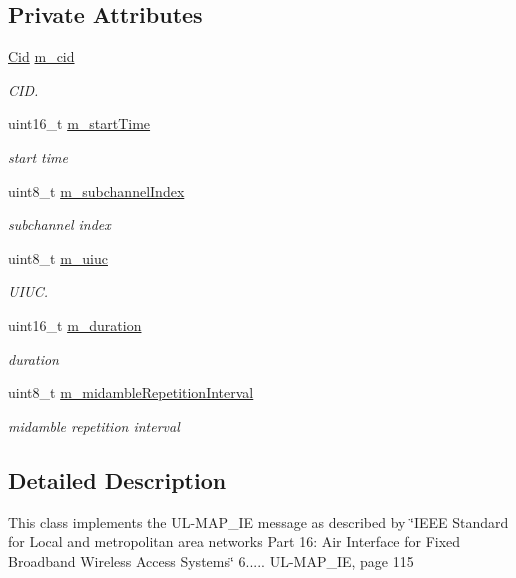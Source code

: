 \subsection*{Private Attributes}
\begin{DoxyCompactItemize}
\item 
\hyperlink{classns3_1_1Cid}{Cid} \hyperlink{classns3_1_1OfdmUlMapIe_a0d44085d6dc47c63c9195d9c0c30232f}{m\+\_\+cid}
\begin{DoxyCompactList}\small\item\em C\+ID. \end{DoxyCompactList}\item 
uint16\+\_\+t \hyperlink{classns3_1_1OfdmUlMapIe_ab287d97fe9e554867d7af2c28b73d28a}{m\+\_\+start\+Time}
\begin{DoxyCompactList}\small\item\em start time \end{DoxyCompactList}\item 
uint8\+\_\+t \hyperlink{classns3_1_1OfdmUlMapIe_a9d85926e578e48adc8e5b58ded98f3c7}{m\+\_\+subchannel\+Index}
\begin{DoxyCompactList}\small\item\em subchannel index \end{DoxyCompactList}\item 
uint8\+\_\+t \hyperlink{classns3_1_1OfdmUlMapIe_ab87646027e885948ad1eaa60585191fc}{m\+\_\+uiuc}
\begin{DoxyCompactList}\small\item\em U\+I\+UC. \end{DoxyCompactList}\item 
uint16\+\_\+t \hyperlink{classns3_1_1OfdmUlMapIe_ae2a683311bd99a6f65db01acf5564653}{m\+\_\+duration}
\begin{DoxyCompactList}\small\item\em duration \end{DoxyCompactList}\item 
uint8\+\_\+t \hyperlink{classns3_1_1OfdmUlMapIe_aaaa11a58269b3257b3b61a2243525ea0}{m\+\_\+midamble\+Repetition\+Interval}
\begin{DoxyCompactList}\small\item\em midamble repetition interval \end{DoxyCompactList}\end{DoxyCompactItemize}


\subsection{Detailed Description}
This class implements the U\+L-\/\+M\+A\+P\+\_\+\+IE message as described by \char`\"{}\+I\+E\+E\+E Standard for
\+Local and metropolitan area networks Part 16\+: Air Interface for Fixed Broadband Wireless Access Systems\char`\"{} 6..... U\+L-\/\+M\+A\+P\+\_\+\+IE, page 115 

